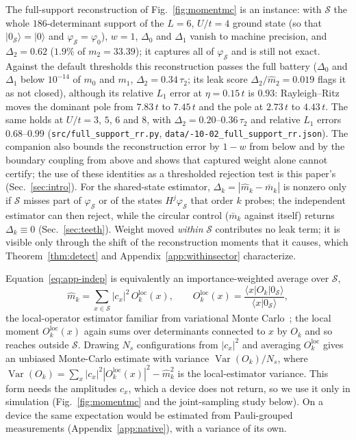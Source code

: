 \documentclass[submission, PhysCore]{SciPost}
\begin{document}
\begin{appendix}
The full-support reconstruction of Fig.~\ref{fig:momentmc} is an instance: with $\mathcal{S}$ the whole $186$-determinant support of the $L=6$, $U/t=4$ ground state (so that $|0_\mathcal{S}\rangle=|0\rangle$ and $\varphi_\mathcal{S}=\varphi_0$), $w=1$, $\Delta_0$ and $\Delta_1$ vanish to machine precision, and $\Delta_2=0.62$ ($1.9\%$ of ${m_2=33.39}$); it captures all of $\varphi_\mathcal{S}$ and is still not exact. Against the default thresholds this reconstruction passes the full battery ($\Delta_0$ and $\Delta_1$ below $10^{-14}$ of $m_0$ and $m_1$, $\Delta_2=0.34\,\tau_2$; its leak score $\Delta_2/\widehat m_2=0.019$ flags it as not closed), although its relative $L_1$ error at $\eta=0.15\,t$ is $0.93$: Rayleigh--Ritz moves the dominant pole from $7.83\,t$ to $7.45\,t$ and the pole at $2.73\,t$ to $4.43\,t$. The same holds at $U/t=3$, $5$, $6$ and $8$, with $\Delta_2=0.20$--$0.36\,\tau_2$ and relative $L_1$ errors $0.68$--$0.99$ (\texttt{src/\allowbreak full\_support\_rr.py}, \texttt{data/-10-02\_full\_support\_rr.json}). The companion also bounds the reconstruction error by $1-w$ from below and by the boundary coupling from above and shows that captured weight alone cannot certify; the use of these identities as a thresholded rejection test is this paper's (Sec.~\ref{sec:intro}). For the shared-state estimator, $\Delta_k=|\widehat{m}_k-\bar m_k|$ is nonzero only if $\mathcal{S}$ misses part of $\varphi_\mathcal{S}$ or of the states $H^j\varphi_\mathcal{S}$ that order $k$ probes; the independent estimator can then reject, while the circular control ($\bar m_k$ against itself) returns $\Delta_k\equiv 0$ (Sec.~\ref{sec:teeth}). Weight moved \emph{within} $\mathcal{S}$ contributes no leak term; it is visible only through the shift of the reconstruction moments that it causes, which Theorem~\ref{thm:detect} and Appendix~\ref{app:withinsector} characterize.

Equation~\eqref{eq:app-indep} is equivalently an importance-weighted average over $\mathcal{S}$,
\begin{equation}
\widehat{m}_k=\sum_{x\in\mathcal{S}}|c_x|^2\,O_k^{\mathrm{loc}}(x),\qquad O_k^{\mathrm{loc}}(x)=\frac{\langle x|O_k|0_\mathcal{S}\rangle}{\langle x|0_\mathcal{S}\rangle},
\end{equation}
the local-operator estimator familiar from variational Monte Carlo~\cite{CarleoTroyer2017}; the local moment $O_k^{\mathrm{loc}}(x)$ again sums over determinants connected to $x$ by $O_k$ and so reaches outside $\mathcal{S}$. Drawing $N_s$ configurations from $|c_x|^2$ and averaging $O_k^{\mathrm{loc}}$ gives an unbiased Monte-Carlo estimate with variance $\operatorname{Var}(O_k)/N_s$, where $\operatorname{Var}(O_k)=\sum_x|c_x|^2|O_k^{\mathrm{loc}}(x)|^2-\widehat m_k^2$ is the local-estimator variance. This form needs the amplitudes $c_x$, which a device does not return, so we use it only in simulation (Fig.~\ref{fig:momentmc} and the joint-sampling study below). On a device the same expectation would be estimated from Pauli-grouped measurements (Appendix~\ref{app:native}), with a variance of its own.


\end{appendix}
\end{document}
